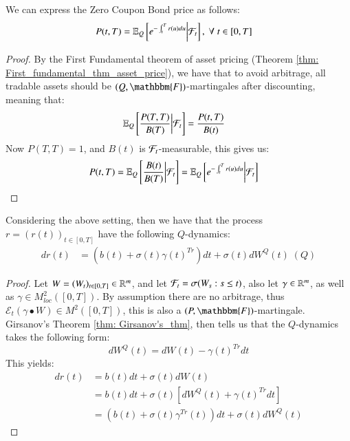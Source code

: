 \begin{result} 
We can express the Zero Coupon  Bond price as follows:
\begin{align*}
P(t,T) &= \mathbb{E}_{Q}\left[
e^{-\int_{t}^{T}r(u)du}\bigg{|}\mathcal{F}_{t}
\right], \;\forall \; t\in[0,T]
\end{align*}
\end{result}

\begin{proof}
By the First Fundamental theorem of asset pricing (Theorem \ref{thm: First_fundamental_thm_asset_price}), we have that to avoid arbitrage, all tradable assets should be $(Q, \mathbbm{F})$-martingales after discounting, meaning that:
\begin{align*}
\mathbb{E}_{Q}\left[
\frac{P(T,T)}{B(T)}
\bigg{|}\mathcal{F}_{t}
\right]
&= 
\frac{P(t,T)}{B(t)}
\end{align*}
Now $P(T,T) = 1$, and $B(t)$ is $\mathcal{F}_{t}$-measurable, this gives us: 
\begin{align*}
P(t,T) &= \mathbb{E}_{Q}\left[
\frac{B(t)}{B(T)}\bigg{|}\mathcal{F}_{t}
\right]  
= \mathbb{E}_{Q}\left[
e^{-\int_{t}^{T}r(u)du}
\bigg{|}\mathcal{F}_{t}
\right]
\end{align*}
\end{proof}


\newpage
\begin{proposition}
Considering the above setting, then we have that the process $r = (r(t))_{t\in [0,T]}$ have the following $Q$-dynamics:
\begin{align*}
dr(t) &= \left(b(t)+\sigma(t)\gamma(t)^{Tr}\right)dt 
+ \sigma(t)dW^{Q}(t) \;(Q)
\end{align*}
\end{proposition} 

\begin{proof}
Let $W = (W_{t})_{t \in [0,T]} \in \mathbb{R}^{m}$, and let $\mathcal{F}_{t} = \sigma(W_{s}:s\leq t)$, also let $\gamma \in \mathbb{R}^{m}$, as well as $\gamma \in M^{2}_{loc}([0,T])$. By assumption there are no arbitrage, thus $\mathcal{E}_{t}(\gamma \bullet W) \in M^{2}([0,T])$, this is also a $(P, \mathbbm{F})$-martingale. Girsanov's Theorem \ref{thm: Girsanov's_thm}, then tells us that the $Q$-dynamics takes the following form:
$$
dW^{Q}(t) = dW(t) - \gamma(t)^{Tr}dt
$$
This yields: 
\begin{align*}
dr(t) &= b(t)dt + \sigma(t)dW(t) \\ 
&=  b(t)dt + \sigma(t)[dW^{Q}(t) + \gamma(t)^{Tr}dt] \\ 
&= \left(b(t) + \sigma(t)\gamma^{Tr}(t)\right)dt + \sigma(t)dW^{Q}(t)
\end{align*}


\end{proof}

